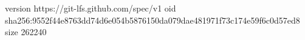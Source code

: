 version https://git-lfs.github.com/spec/v1
oid sha256:9552f44e8763dd74d6e054b5876150da079dae481971f73c174e59f6c0d57ed8
size 262240
